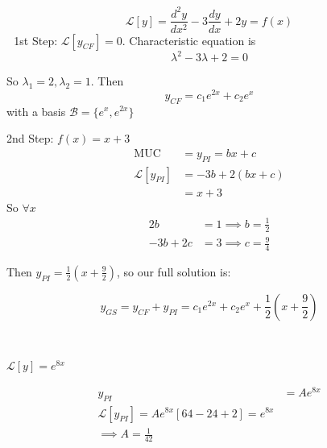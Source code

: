 \documentclass[twoside]{scrartcl}
\begin{document}
\begin{example}
\[\mathcal{L}[y] = \frac{d^2y}{dx^2} - 3\frac{dy}{dx} + 2y = f(x)\]	 
1st Step: $\mathcal{L}[y_{CF}] = 0$. Characteristic equation is 
\[
  \lambda^2 - 3\lambda + 2 = 0
\]

So $\lambda_1 = 2, \lambda_2 = 1$. Then 
\[y_{CF} = c_1e^{2x} + c_2e^{x}\]
with a basis $\mathcal{B} = \{e^{x}, e^{2x}\}$

2nd Step: $f(x) = x+3$
\[
\begin{aligned}
  \mathrm{MUC} &= y_{PI} = bx + c\\
  \mathcal{L}[y_{PI}] &= -3b + 2(bx + c)\\
  &= x + 3
\end{aligned}
\]
So $\forall x$ 
\[
\begin{aligned}
  2b &= 1 \implies b = \frac{1}{2}\\
  -3b + 2c &= 3 \implies c = \frac{9}{4}
\end{aligned}
\]

Then $y_{PI} = \frac{1}{2}(x+\frac{9}{2})$, so our full solution is:

\[y_{GS} = y_{CF} + y_{PI} = c_1e^{2x} + c_2e^x + \frac{1}{2}\left(x+\frac{9}{2}\right)\]

\end{example}~

\begin{example}

$\mathcal{L}[y] = e^{8x}$

\[
\begin{aligned}
  y_{PI} &= Ae^{8x}\\
  \mathcal{L}[y_{PI}] = Ae^{8x}[64 -24 +2] = e^{8x}\\
  \implies A = \frac{1}{42}
\end{aligned}
\]
\end{example}~
\end{document}
